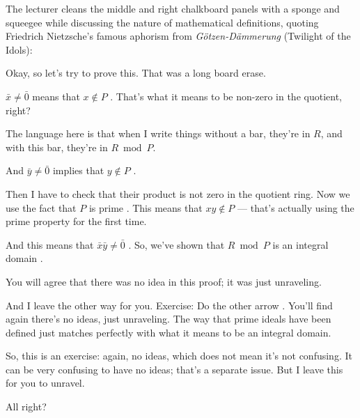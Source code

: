 \begin{note}
The lecturer cleans the middle and right chalkboard panels with a sponge and squeegee while discussing the nature of mathematical definitions, quoting Friedrich Nietzsche's famous aphorism from \emph{Götzen-Dämmerung} (Twilight of the Idols): 
\end{note}

\begin{speech}[01:00:16 - 01:01:22]
Okay, so let's try to prove this. That was a long board erase.

$\bar{x} \neq \bar{0}$ means that $x \notin P$ . That's what it means to be non-zero in the quotient, right?

The language here is that when I write things without a bar, they're in $R$, and with this bar, they're in $R \bmod P$.

And $\bar{y} \neq \bar{0}$ implies that $y \notin P$ .

Then I have to check that their product is not zero in the quotient ring. Now we use the fact that $P$ is prime . This means that $xy \notin P$  --- that's actually using the prime property for the first time.

And this means that $\bar{x}\bar{y} \neq \bar{0}$ . So, we've shown that $R \bmod P$ is an integral domain .

You will agree that there was no idea in this proof; it was just unraveling.
\end{speech}

\begin{speech}[01:01:22 - 01:02:08]
And I leave the other way for you. Exercise: Do the other arrow . You'll find again there's no ideas, just unraveling. The way that prime ideals have been defined just matches perfectly with what it means to be an integral domain.

So, this is an exercise: again, no ideas, which does not mean it's not confusing. It can be very confusing to have no ideas; that's a separate issue.  But I leave this for you to unravel.

All right?
\end{speech}

